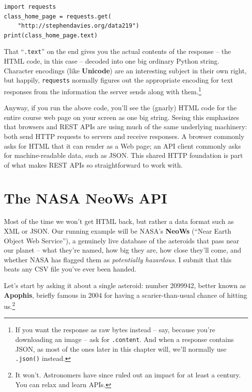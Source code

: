 \begin{Verbatim}[fontsize=\small,samepage=true,frame=single,framesep=3mm]
import requests
class_home_page = requests.get(
    "http://stephendavies.org/data219")
print(class_home_page.text)
\end{Verbatim}


That ``\texttt{.text}'' on the end gives you the actual contents of the
response -- the HTML code, in this case -- decoded into one big ordinary
Python string. Character encodings (like \textbf{Unicode}) are an interesting
subject in their own right, but happily, \texttt{requests} normally figures
out the appropriate encoding for text responses from the information the
server sends along with them.\footnote{If you want the response as raw bytes
instead -- say, because you're downloading an image -- ask for
\texttt{.content}. And when a response contains JSON, as most of the ones
later in this chapter will, we'll normally use \texttt{.json()} instead.}

Anyway, if you run the above code, you'll see the (gnarly) HTML code for the
entire course web page on your screen as one big string. Seeing this emphasizes
that browsers and REST APIs are using much of the same underlying machinery:
both send HTTP requests to servers and receive responses. A browser commonly
asks for HTML that it can render as a Web page; an API client commonly asks for
machine-readable data, such as JSON. This shared HTTP foundation is part of
what makes REST APIs so straightforward to work with.

\section{The NASA NeoWs API}

Most of the time we won't get HTML back, but rather a data format such as XML
or JSON. Our running example will be NASA's \textbf{NeoWs} (``Near Earth
Object Web Service''), a genuinely live database of the asteroids that pass
near our planet -- what they're named, how big they are, how close they'll
come, and whether NASA has flagged them as \textit{potentially hazardous}. I
submit that this beats any CSV file you've ever been handed.


Let's start by asking it about a single asteroid: number 2099942, better known
as \textbf{Apophis}, briefly famous in 2004 for having a scarier-than-usual
chance of hitting us.\footnote{It won't. Astronomers have since ruled out an
impact for at least a century. You can relax and learn APIs.} 

